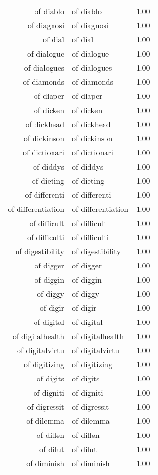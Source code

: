 \begin{table}[ht]
\begin{tabular}{rlr}
  of diablo & of diablo & 1.00 \\ 
  of diagnosi & of diagnosi & 1.00 \\ 
  of dial & of dial & 1.00 \\ 
  of dialogue & of dialogue & 1.00 \\ 
  of dialogues & of dialogues & 1.00 \\ 
  of diamonds & of diamonds & 1.00 \\ 
  of diaper & of diaper & 1.00 \\ 
  of dicken & of dicken & 1.00 \\ 
  of dickhead & of dickhead & 1.00 \\ 
  of dickinson & of dickinson & 1.00 \\ 
  of dictionari & of dictionari & 1.00 \\ 
  of diddys & of diddys & 1.00 \\ 
  of dieting & of dieting & 1.00 \\ 
  of differenti & of differenti & 1.00 \\ 
  of differentiation & of differentiation & 1.00 \\ 
  of difficult & of difficult & 1.00 \\ 
  of difficulti & of difficulti & 1.00 \\ 
  of digestibility & of digestibility & 1.00 \\ 
  of digger & of digger & 1.00 \\ 
  of diggin & of diggin & 1.00 \\ 
  of diggy & of diggy & 1.00 \\ 
  of digir & of digir & 1.00 \\ 
  of digital & of digital & 1.00 \\ 
  of digitalhealth & of digitalhealth & 1.00 \\ 
  of digitalvirtu & of digitalvirtu & 1.00 \\ 
  of digitizing & of digitizing & 1.00 \\ 
  of digits & of digits & 1.00 \\ 
  of digniti & of digniti & 1.00 \\ 
  of digressit & of digressit & 1.00 \\ 
  of dilemma & of dilemma & 1.00 \\ 
  of dillen & of dillen & 1.00 \\ 
  of dilut & of dilut & 1.00 \\ 
  of diminish & of diminish & 1.00 \\ 

\end{tabular}
\end{table}
